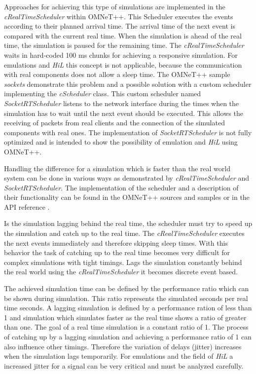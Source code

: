 Approaches for achieving this type of simulations are implemented in the \emph{cRealTimeScheduler} within OMNeT++.
This Scheduler executes the events according to their planned arrival time.
The arrival time of the next event is compared with the current real time.
When the simulation is ahead of the real time, the simulation is paused for the remaining time.
The \emph{cRealTimeScheduler} waits in hard-coded 100 ms chunks for achieving a responsive simulation.
For emulations and \emph{HiL} this concept is not applicable, because the communication with real components does not allow a sleep time.
The OMNeT++ sample \emph{sockets} demonstrate this problem and a possible solution with a custom scheduler implementing the \emph{cScheduler} class.
This custom scheduler named \emph{SocketRTScheduler} listens to the network interface during the times when the simulation has to wait until the next event should be executed.
This allows the receiving of packets from real clients and the connection of the simulated components with real ones.
The implementation of \emph{SocketRTScheduler} is not fully optimized and is intended to show the possibility of emulation and \emph{HiL} using OMNeT++.

Handling the difference for a simulation which is faster than the real world system can be done in various ways as demonstrated by \emph{cRealTimeScheduler} and \emph{SocketRTScheduler}.
The implementation of the scheduler and a description of their functionality can be found in the OMNeT++ sources and samples or in the API reference \cite{omnet_api}.

Is the simulation lagging behind the real time, the scheduler must try to speed up the simulation and catch up to the real time.
The \emph{cRealTimeScheduler} executes the next events immediately and therefore skipping sleep times.
With this behavior the task of catching up to the real time becomes very difficult for complex simulations with tight timings.
Lags the simulation constantly behind the real world using the \emph{cRealTimeScheduler} it becomes discrete event based.

The achieved simulation time can be defined by the performance ratio which can be shown during simulation.
This ratio represents the simulated seconds per real time seconds.
A lagging simulation is defined by a performance ration of less than 1 and simulation which simulates faster as the real time shows a ratio of greater than one.
The goal of a real time simulation is a constant ratio of 1.
The process of catching up by a lagging simulation and achieving a performance ratio of 1 can also influence other timings.
Therefore the variation of delays (jitter) increases when the simulation lags temporarily.
For emulations and the field of \emph{HiL} a increased jitter for a signal can be very critical and must be analyzed carefully.

